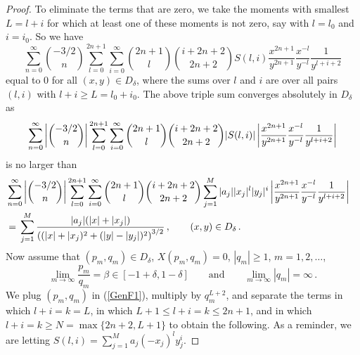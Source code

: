 \documentclass{article}
\theoremstyle{remark}
\numberwithin{equation}{section}
\begin{document}
\begin{proof}
To eliminate the terms that are zero, we take the moments with smallest $L = l+i$ for which at least one of these moments is not zero, 
say with $l= l_0$ and $i=i_0$.  So we have 
$$\sum_{n=0}^\infty{\binom{-3/2}{n} \sum_{l=0}^{2n+1}\sum_{i=0}^\infty \binom{2n+1}l \binom{i+2n+2}{2n+2} S(l,i)
\frac{x^{2n+1}}{y^{2n+1}}\frac {x^{-l}}{y^{-l}}\frac 1{y^{l+i+2}}} $$
equal to $0$ for all $(x,y) \in D_\delta$, where the sums over $l$ and $i$ are over all pairs $(l,i)$ with $l+i \geq L = l_0+i_0$.
The above triple sum converges absolutely in $D_\delta$ as
\begin{equation} \notag
 \sum_{n=0}^\infty{\left| \binom{-3/2}{n} \right| \sum_{l=0}^{2n+1}\sum_{i=0}^\infty \binom{2n+1}l \binom{i+2n+2}{2n+2}
|S(l,i)| 
\left| \frac{x^{2n+1}}{y^{2n+1}}\frac {x^{-l}}{y^{-l}}\frac 1{y^{l+i+2}}\right|}
\end{equation} 
is no larger than
\begin{equation}\notag \begin{split}
& \sum_{n=0}^\infty \left| \binom{-3/2}{n} \right| \sum_{l=0}^{2n+1} \sum_{i=0}^\infty \binom{2n+1}l \binom{i+2n+2}{2n+2}  \sum_{j=1}^M{|a_j||x_j|^l|y_j|^i} 
\left| \frac{x^{2n+1}}{y^{2n+1}} \frac{x^{-l}}{y^{-l}} \frac{1}{y^{l+i+2}} \right| \cr
&= \, \sum_{j=1}^M{\frac{|a_j|(|x|+|x_j|)}{\left( (|x|+|x_j)^2 + (|y| - |y_j|)^2 \right)^{3/2}}}\,, \qquad (x,y) \in D_\delta\,. \cr
\end{split} \end{equation}
Now assume that $(p_m,q_m) \in D_{\delta}$, $X(p_m,q_m) = 0$, $|q_m| \geq 1$, $m=1,2,\ldots$,  
$$\lim_{m \rightarrow \infty}{\frac{p_m}{q_m}} = \beta \in [-1+\delta,1-\delta] \qquad \text{and} \qquad \lim_{m \rightarrow \infty}{|q_m|} = \infty\,.$$ 
We plug $(p_m,q_m)$ in (\ref{GenF1}), multiply by $q_m^{L+2}$, and separate the terms in which $l+i=k=L$, in which $L+1 \leq l+i = k \leq 2n+1$, and in which $l+i = k \geq N = \max\{2n+2,L+1\}$ 
to obtain the following.  As a reminder, we are letting $S(l,i) = \sum\limits_{j=1}^M{a_j(-x_j)^ly_j^i}$.


\end{proof}
\end{document}
